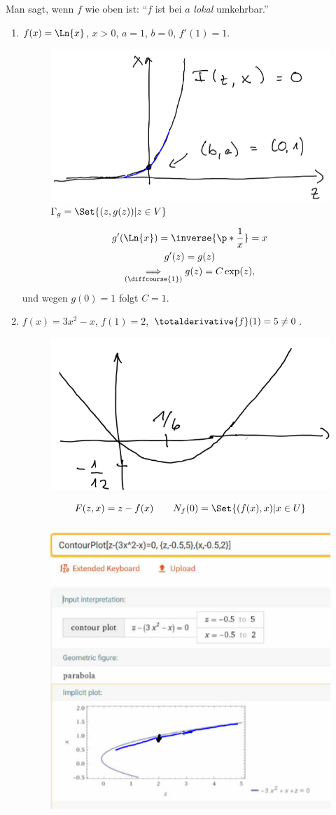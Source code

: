 Man sagt, wenn \( f \) wie oben ist: \enquote{\( f \) ist bei \( a \) \emph{lokal} umkehrbar.}
\begin{beispiele}
  \begin{enumerate}
    \item \( f(x)= \Ln{x} \), \( x>0 \), \( a=1 \), \( b=0 \), \( f'(1)=1 \).
    \begin{figure}[H]
      \centering
      \includegraphics[width=0.5\linewidth]{figures/satz_von_der_umkehrungsfunktion_beispiel_ln}
      \caption*{\textcolor{Blue}{\( \Gamma_g=\Set{(z,g(z))|z\in V} \)}}
      \label{fig:satz_von_der_umkehrungsfunktion_beispiel_ln}
    \end{figure}
    \begin{gather*}
      g'(\Ln{x})=\inverse{\p*{ \frac{1}{x} }}=x\\
      g'(z)=g(z)\\
      \underset{(\text{\diffcourse{1}})}{\implies} g(z)=C\exp (z),
    \end{gather*}
    und wegen \( g(0)=1 \) folgt \( C=1 \).
    \item \( f(x)=3x^2-x \), \( f(1)=2 \), \( \totalderivative{f}(1)=5\neq 0 \).
    \begin{figure}[H]
      \centering
      \includegraphics[width=0.5\linewidth]{figures/satz_von_der_umkehrungsfunktion_beispiel_parabel}
      \label{fig:satz_von_der_umkehrungsfunktion_beispiel_parabel}
    \end{figure}
    \begin{equation*}
      F(z,x)=z-f(x)\qquad N_f(0)=\Set{(f(x),x)|x\in U}
    \end{equation*}
    \begin{figure}[H]
      \centering
      \includegraphics[width=0.5\linewidth]{figures/satz_von_der_umkehrungsfunktion_beispiel_parabel_umkehrung}

\end{figure}
\end{enumerate}
\end{beispiele}
